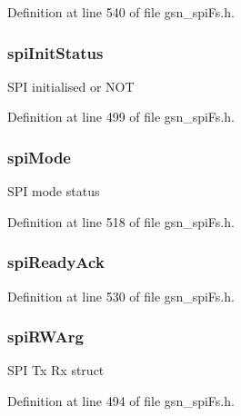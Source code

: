 Definition at line 540 of file gsn\_\-spiFs.h.

\hypertarget{a00232_a37e30f5b408d31bdf077d448268cee43}{
\subsubsection[{spiInitStatus}]{ {\bf spiInitStatus}}}
\label{a00232_a37e30f5b408d31bdf077d448268cee43}
SPI initialised or NOT 

Definition at line 499 of file gsn\_\-spiFs.h.

\hypertarget{a00232_a222e972463285c6028dbe0b209416401}{
\subsubsection[{spiMode}]{ {\bf spiMode}}}
\label{a00232_a222e972463285c6028dbe0b209416401}
SPI mode status 

Definition at line 518 of file gsn\_\-spiFs.h.

\hypertarget{a00232_a7d64b559bc60710f2a2399d32349f735}{
\subsubsection[{spiReadyAck}]{ {\bf spiReadyAck}}}
\label{a00232_a7d64b559bc60710f2a2399d32349f735}


Definition at line 530 of file gsn\_\-spiFs.h.

\hypertarget{a00232_ae5d2dc9000a0a784dfad8020cc9bd8a5}{
\subsubsection[{spiRWArg}]{ {\bf spiRWArg}}}
\label{a00232_ae5d2dc9000a0a784dfad8020cc9bd8a5}
SPI Tx Rx struct 

Definition at line 494 of file gsn\_\-spiFs.h.

